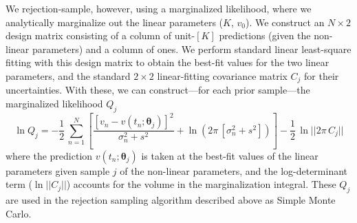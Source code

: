 \documentclass[manuscript, letterpaper]{aastex6}
\newcommand{\bs}[1]{\boldsymbol{#1}}
\begin{document}
We rejection-sample, however, using a marginalized likelihood, where we
analytically marginalize out the linear parameters ($K$, $v_0$).
We construct an $N \times 2$ design matrix consisting of a column of unit-$[K]$
predictions (given the non-linear parameters) and a column of ones.
We perform standard linear least-square fitting with this design
matrix to obtain the best-fit values for the two linear parameters,
and the standard $2\times 2$ linear-fitting covariance matrix $C_j$ for their
uncertainties.
With these, we can construct---for each prior sample---the marginalized
likelihood $Q_j$
\begin{equation}
\ln Q_j = -\frac{1}{2}\,\sum_{n=1}^N \left[\frac{[v_n - v(t_n;\bs{\theta}_j)]^2}{\sigma_n^2 + s^2}
 +\ln \left(2\pi\,[\sigma_n^2 + s^2]\right) \right] -\frac{1}{2}\,\ln ||2\pi\,C_j||
\end{equation}
where the prediction $v(t_n;\bs{\theta}_j)$ is taken at the best-fit values of
the linear parameters given sample $j$ of the non-linear parameters, and the
log-determinant term ($\ln ||C_j||$) accounts for the volume in the
marginalization integral.
These $Q_j$ are used in the rejection sampling algorithm described above
as Simple Monte Carlo.
\end{document}
